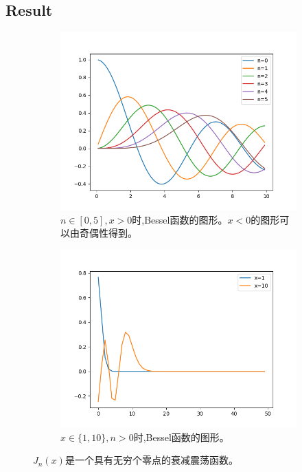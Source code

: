 \documentclass[9pt,a4paper,twoside]{tau-class/tau}
\begin{document}
\subsection{Result}
\newpage
\begin{figure}[t] %
	\centering
	\begin{subfigure}[b]{0.4\linewidth}
	\includegraphics[width=\linewidth]{figures/BesselN.png}
	\caption{$n\in [0,5],x>0$时,Bessel函数的图形。$x<0$的图形可以由奇偶性得到。}
	\label{fig:figa}
	\end{subfigure}
	\hspace{20pt}   %
	\begin{subfigure}[b]{0.4\linewidth} %
		\includegraphics[width=\linewidth]{figures/BesselX.png}
		\caption{$x\in\{1,10\},n>0$时,Bessel函数的图形。}
		\label{fig:figb}
	\end{subfigure}
	\caption{$J_n(x)$是一个具有无穷个零点的衰减震荡函数。 \cite{PFGPlots}}
	\label{fig:examplefloat}
\end{figure}
\end{document}
